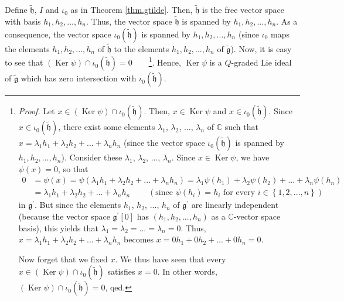 \documentclass[etingof-lie.tex]{subfiles}
\begin{document}
Define $\widetilde{\mathfrak{h}}$, $I$ and $\iota_{0}$ as in Theorem
\ref{thm.gtilde}. Then, $\widetilde{\mathfrak{h}}$ is the free vector space
with basis $h_{1},h_{2},...,h_{n}$. Thus, the vector space
$\widetilde{\mathfrak{h}}$ is spanned by $h_{1},h_{2},...,h_{n}$. As a
consequence, the vector space $\iota_{0}\left(  \widetilde{\mathfrak{h}%
}\right)  $ is spanned by $h_{1},h_{2},...,h_{n}$ (since $\iota_{0}$ maps the
elements $h_{1},h_{2},...,h_{n}$ of $\widetilde{\mathfrak{h}}$ to the elements
$h_{1},h_{2},...,h_{n}$ of $\widetilde{\mathfrak{g}}$). Now, it is easy to see
that $\left(  \operatorname*{Ker}\psi\right)  \cap\iota_{0}\left(
\widetilde{\mathfrak{h}}\right)  =0$\ \ \ \ \footnote{\textit{Proof.} Let
$x\in\left(  \operatorname*{Ker}\psi\right)  \cap\iota_{0}\left(
\widetilde{\mathfrak{h}}\right)  $. Then, $x\in\operatorname*{Ker}\psi$ and
$x\in\iota_{0}\left(  \widetilde{\mathfrak{h}}\right)  $. Since $x\in\iota
_{0}\left(  \widetilde{\mathfrak{h}}\right)  $, there exist some elements
$\lambda_{1}$, $\lambda_{2}$, $...$, $\lambda_{n}$ of $\mathbb{C}$ such that
$x=\lambda_{1}h_{1}+\lambda_{2}h_{2}+...+\lambda_{n}h_{n}$ (since the vector
space $\iota_{0}\left(  \widetilde{\mathfrak{h}}\right)  $ is spanned by
$h_{1},h_{2},...,h_{n}$). Consider these $\lambda_{1}$, $\lambda_{2}$, $...$,
$\lambda_{n}$. Since $x\in\operatorname*{Ker}\psi$, we have $\psi\left(
x\right)  =0$, so that%
\begin{align*}
0  &  =\psi\left(  x\right)  =\psi\left(  \lambda_{1}h_{1}+\lambda_{2}%
h_{2}+...+\lambda_{n}h_{n}\right)  =\lambda_{1}\psi\left(  h_{1}\right)
+\lambda_{2}\psi\left(  h_{2}\right)  +...+\lambda_{n}\psi\left(  h_{n}\right)
\\
&  =\lambda_{1}h_{1}+\lambda_{2}h_{2}+...+\lambda_{n}h_{n}%
\ \ \ \ \ \ \ \ \ \ \left(  \text{since }\psi\left(  h_{i}\right)
=h_{i}\text{ for every }i\in\left\{  1,2,...,n\right\}  \right)
\end{align*}
in $\mathfrak{g}^{\prime}$. But since the elements $h_{1}$, $h_{2}$, $...$,
$h_{n}$ of $\mathfrak{g}^{\prime}$ are linearly independent (because the
vector space $\mathfrak{g}^{\prime}\left[  0\right]  $ has $\left(
h_{1},h_{2},...,h_{n}\right)  $ as a $\mathbb{C}$-vector space basis), this
yields that $\lambda_{1}=\lambda_{2}=...=\lambda_{n}=0$. Thus, $x=\lambda
_{1}h_{1}+\lambda_{2}h_{2}+...+\lambda_{n}h_{n}$ becomes $x=0h_{1}%
+0h_{2}+...+0h_{n}=0$.
\par
Now forget that we fixed $x$. We thus have seen that every $x\in\left(
\operatorname*{Ker}\psi\right)  \cap\iota_{0}\left(  \widetilde{\mathfrak{h}%
}\right)  $ satisfies $x=0$. In other words, $\left(  \operatorname*{Ker}%
\psi\right)  \cap\iota_{0}\left(  \widetilde{\mathfrak{h}}\right)  =0$, qed.}.
Hence, $\operatorname*{Ker}\psi$ is a $Q$-graded Lie ideal of
$\widetilde{\mathfrak{g}}$ which has zero intersection with $\iota_{0}\left(
\widetilde{\mathfrak{h}}\right)  $.
\end{document}

